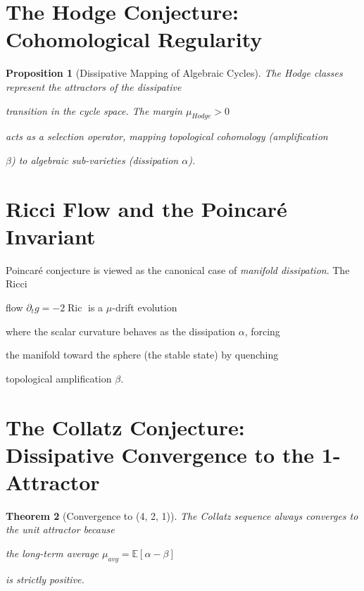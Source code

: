 ﻿\documentclass[11pt,a4paper]{amsart}
\newtheorem{theorem}{Theorem}[section]
\newtheorem{proposition}[theorem]{Proposition}
\newcommand{\alphacoeff}{\ensuremath{\alpha}}
\newcommand{\betacoeff}{\ensuremath{\beta}}
\newcommand{\mumargin}{\ensuremath{\mu}}
\begin{document}

\section{The Hodge Conjecture: Cohomological Regularity}

\begin{proposition}[Dissipative Mapping of Algebraic Cycles]

The Hodge classes represent the \emph{attractors} of the dissipative

transition in the cycle space. The margin $\mumargin_{Hodge} > 0$

acts as a selection operator, mapping topological cohomology (amplification

$\betacoeff$) to algebraic sub-varieties (dissipation $\alphacoeff$).

\end{proposition}




\section{Ricci Flow and the Poincaré Invariant}

Poincaré conjecture is viewed as the canonical case of \emph{manifold dissipation}. The Ricci

flow $\partial_t g = -2\operatorname{Ric}$ is a $\mumargin$-drift evolution

where the scalar curvature behaves as the dissipation $\alphacoeff$, forcing

the manifold toward the sphere (the stable state) by quenching

topological amplification $\betacoeff$.




\section{The Collatz Conjecture: Dissipative Convergence to the 1-Attractor}

\begin{theorem}[Convergence to (4, 2, 1)]

The Collatz sequence always converges to the unit attractor because

the long-term average $\mumargin_{avg} = \mathbb{E}[\alphacoeff - \betacoeff]$

is strictly positive.

\end{theorem}
\end{document}

